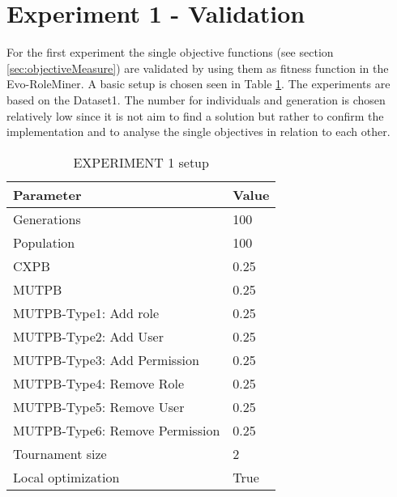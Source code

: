 \section{Experiment 1 - Validation}
\label{sec:exp1}
For the first experiment the single objective functions (see section \ref{sec:objectiveMeasure}) are validated by using them as fitness function in the Evo-RoleMiner. A basic setup is chosen seen in Table \ref{tab:exp1_setup}. The experiments are based on the Dataset1. The number for individuals and generation is chosen relatively low since it is not aim to find a solution but rather to confirm the implementation and to analyse the single objectives in relation to each other.

\begin{table}[H]
    \centering
    \begin{adjustbox}{width=0.5\textwidth}
	    \begin{tabular}{|l|l|}
	        \hline
	        \rowcolor{gray!25} 
	        \textbf{Parameter}              & \textbf{Value}    \\ \hline
	        Generations                     & 100              \\ \hline
	        Population                      & 100              \\ \hline
	        CXPB                            & 0.25              \\ \hline
	        MUTPB                           & 0.25              \\ \hline
	        MUTPB-Type1: Add role           & 0.25              \\ \hline
	        MUTPB-Type2: Add User           & 0.25              \\ \hline
	        MUTPB-Type3: Add Permission     & 0.25              \\ \hline
	        MUTPB-Type4: Remove Role        & 0.25              \\ \hline
	        MUTPB-Type5: Remove User        & 0.25              \\ \hline
	        MUTPB-Type6: Remove Permission  & 0.25              \\ \hline
	        Tournament size                 & 2                 \\ \hline
	        Local optimization              & True              \\ \hline
	    \end{tabular}
	\end{adjustbox}
    \caption{EXPERIMENT 1 setup}
    \label{tab:exp1_setup}
\end{table}

